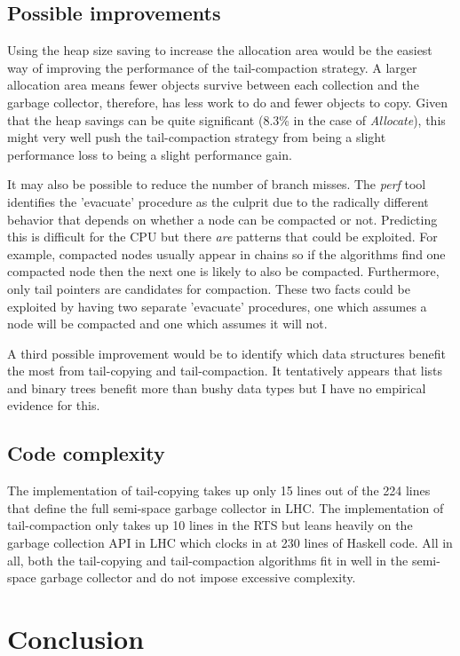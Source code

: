 \documentclass[a4paper,oneside]{memoir}
\begin{document}
\section{Possible improvements}

Using the heap size saving to increase the allocation area would be the easiest
way of improving the performance of the tail-compaction strategy. A larger
allocation area means fewer objects survive between each collection and the
garbage collector, therefore, has less work to do and fewer objects to copy. Given
that the heap savings can be quite significant (8.3\% in the case of
\emph{Allocate}), this might very well push the tail-compaction strategy from
being a slight performance loss to being a slight performance gain.

It may also be possible to reduce the number of branch misses. The \emph{perf}
tool identifies the 'evacuate' procedure as the culprit due to the radically
different behavior that depends on whether a node can be compacted or not.
Predicting this is difficult for the CPU but there \emph{are} patterns that
could be exploited. For example, compacted nodes usually appear in chains so
if the algorithms find one compacted node then the next one is likely to also
be compacted. Furthermore, only tail pointers are candidates for compaction.
These two facts could be exploited by having two separate 'evacuate' procedures,
one which assumes a node will be compacted and one which assumes it will not.

A third possible improvement would be to identify which data structures benefit
the most from tail-copying and tail-compaction. It tentatively appears that
lists and binary trees benefit more than bushy data types but I have no
empirical evidence for this.

\section{Code complexity}

The implementation of tail-copying takes up only 15 lines out of the 224 lines
that define the full semi-space garbage collector in LHC. The implementation of
tail-compaction only takes up 10 lines in the RTS but leans heavily on the
garbage collection API in LHC which clocks in at 230 lines of Haskell code. All
in all, both the tail-copying and tail-compaction algorithms fit in well in
the semi-space garbage collector and do not impose excessive complexity.

\chapter{Conclusion}
\end{document}
